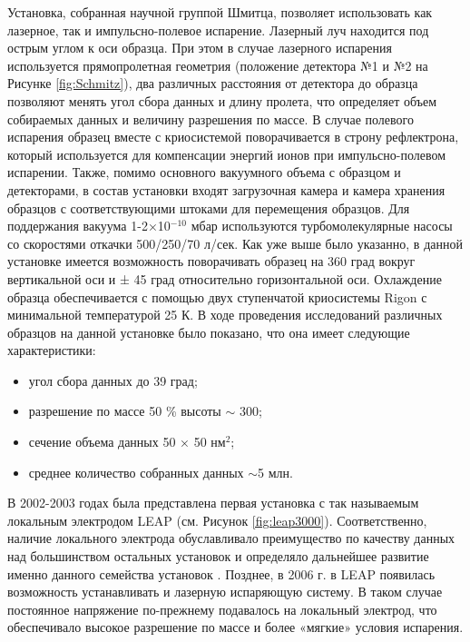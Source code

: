 Установка, собранная научной группой Шмитца, позволяет использовать как лазерное, так и импульсно-полевое испарение. Лазерный луч находится под острым углом к оси образца. При этом в случае лазерного испарения используется прямопролетная геометрия (положение детектора №1 и №2 на Рисунке \cref{fig:Schmitz}), два различных расстояния от детектора до образца позволяют менять угол сбора данных и длину пролета, что определяет объем собираемых данных и величину разрешения по массе. В случае полевого испарения образец вместе с криосистемой поворачивается в строну рефлектрона, который используется для компенсации энергий ионов при импульсно-полевом испарении. Также, помимо основного вакуумного объема с образцом и детекторами, в состав установки входят загрузочная камера и камера хранения образцов с соответствующими штоками для перемещения образцов. Для поддержания вакуума 1-2×10$^{-10}$ мбар используются турбомолекулярные насосы со скоростями откачки 500/250/70 л/сек. Как уже выше было указанно, в данной установке имеется возможность поворачивать образец на 360 град вокруг вертикальной оси и ± 45 град относительно горизонтальной оси. Охлаждение образца обеспечивается с помощью двух ступенчатой криосистемы Rigon с минимальной температурой 25 К. В ходе проведения исследований различных образцов на данной установке было показано, что она имеет следующие характеристики:
\begin{itemize}[beginpenalty=10000] %
	\item угол сбора данных до 39 град;
	\item разрешение по массе 50 \% высоты $\sim$ 300;
	\item сечение объема данных 50 × 50 нм$^{2}$;
	\item среднее количество собранных данных $\sim$5 млн.
\end{itemize}	

В 2002-2003 годах была представлена первая установка с так называемым локальным электродом LEAP (см. Рисунок \cref{fig:leap3000}). Соответственно, наличие локального электрода обуславливало преимущество по качеству данных над большинством остальных установок и определяло дальнейшее развитие именно данного семейства установок \cite{Kelly00}. Позднее, в 2006 г. в LEAP появилась возможность устанавливать и лазерную испаряющую систему. В таком случае постоянное напряжение по-прежнему подавалось на локальный электрод, что обеспечивало высокое разрешение по массе и более «мягкие» условия испарения.

